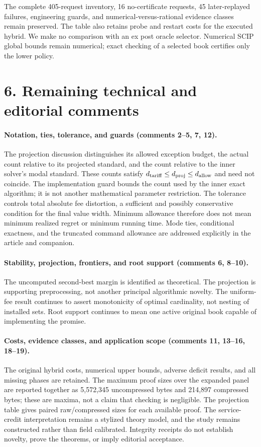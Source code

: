 \documentclass[11pt,letterpaper]{article}
\theoremstyle{definition}\newtheorem{remark}[theorem]{Remark}
\begin{document}
The complete 405-request inventory, 16 no-certificate requests, 45 later-replayed failures, engineering guards, and numerical-versus-rational evidence classes remain preserved. The table also retains probe and restart costs for the executed hybrid. We make no comparison with an ex post oracle selector. Numerical SCIP global bounds remain numerical; exact checking of a selected book certifies only the lower policy.

\section*{6. Remaining technical and editorial comments}
\paragraph{Notation, ties, tolerance, and guards (comments 2--5, 7, 12).}
The projection discussion distinguishes its allowed exception budget, the actual count relative to its projected standard, and the count relative to the inner solver's modal standard. These counts satisfy $d_{\rm tariff}\leq d_{\rm proj}\leq d_{\rm allow}$ and need not coincide. The implementation guard bounds the count used by the inner exact algorithm; it is not another mathematical parameter restriction. The tolerance controls total absolute fee distortion, a sufficient and possibly conservative condition for the final value width. Minimum allowance therefore does not mean minimum realized regret or minimum running time. Mode ties, conditional exactness, and the truncated command allowance are addressed explicitly in the article and companion.

\paragraph{Stability, projection, frontiers, and root support (comments 6, 8--10).}
The uncomputed second-best margin is identified as theoretical. The projection is supporting preprocessing, not another principal algorithmic novelty. The uniform-fee result continues to assert monotonicity of optimal cardinality, not nesting of installed sets. Root support continues to mean one active original book capable of implementing the promise.

\paragraph{Costs, evidence classes, and application scope (comments 11, 13--16, 18--19).}
The original hybrid costs, numerical upper bounds, adverse deficit results, and all missing phases are retained. The maximum proof sizes over the expanded panel are reported together as 5,572,345 uncompressed bytes and 214,897 compressed bytes; these are maxima, not a claim that checking is negligible. The projection table gives paired raw/compressed sizes for each available proof. The service-credit interpretation remains a stylized theory model, and the study remains constructed rather than field calibrated. Integrity receipts do not establish novelty, prove the theorems, or imply editorial acceptance.
\end{document}

